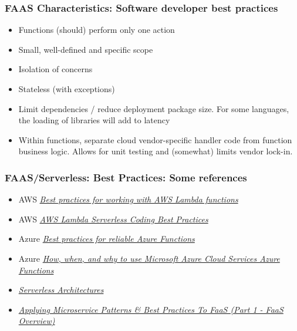 \documentclass[11pt,aspectratio=169]{beamer}
\begin{document}
\begin{nrcanFrame}
  \frametitle{FAAS Characteristics: Software developer best practices}
    \begin{itemize}
  \item Functions (should) perform only one action
  \item Small, well-defined and specific scope
  \item Isolation of concerns
  \item Stateless (with exceptions)
  \item Limit dependencies / reduce deployment package size. For some languages, the loading of
    libraries will add to latency
  \item Within functions, separate cloud vendor-specific handler code from function business
    logic.
    Allows for unit testing and (somewhat) limits vendor lock-in.
    \end{itemize}
\end{nrcanFrame}




\begin{nrcanFrame}
  \frametitle{FAAS/Serverless: Best Practices: Some references}
  \begin{itemize}
  \item AWS
    \textit{\href{https://docs.aws.amazon.com/lambda/latest/dg/best-practices.html}
      {Best practices for working with AWS Lambda functions}}

  \item AWS
    \textit{\href{https://www.intentsg.com/aws-lambda-serverless-coding-best-practices/}
      {AWS Lambda Serverless Coding Best Practices}}

  \item Azure
    \textit{\href{https://docs.microsoft.com/en-us/azure/azure-functions/functions-best-practices?tabs=csharp}
      {Best practices for reliable Azure Functions}}

  \item Azure
    \textit{\href{https://www.devbridge.com/articles/how-when-and-why-to-use-microsoft-azure-cloud-services/}
      {How, when, and why to use Microsoft Azure Cloud Services Azure Functions}}

    \item
      \textit{\href{https://martinfowler.com/articles/serverless.html}
        {Serverless Architectures}}
      
  \item
    \textit{\href{https://www.captechconsulting.com/blogs/applying-microservice-patterns-best-practices-to-faas-part-1-faas-overview}
      {Applying Microservice Patterns \& Best Practices To FaaS (Part 1 - FaaS Overview)}}
    \end{itemize}
\end{nrcanFrame}
\end{document}
